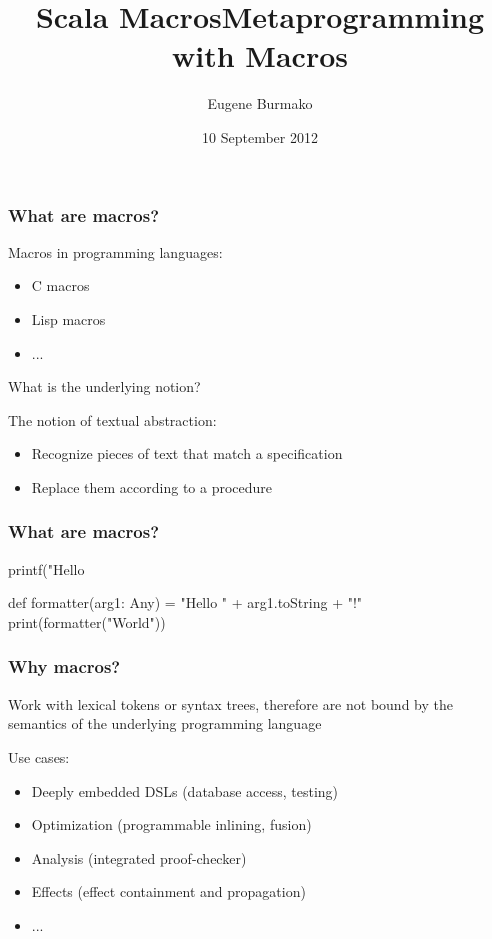 \documentclass[hyperref={bookmarks=false}]{beamer}
\title{Scala Macros}
\begin{document}
\title{Metaprogramming with Macros}
\author{Eugene Burmako}
\date{10 September 2012}
{
\begin{frame}
  \titlepage
\end{frame}
}

\begin{frame}[fragile]
\frametitle{What are macros?}
Macros in programming languages:
\begin{itemize}
\item C macros
\item Lisp macros
\item ...
\end{itemize}

\vskip25pt
What is the underlying notion?
\vskip25pt
\pause

The notion of textual abstraction:
\begin{itemize}
\item Recognize pieces of text that match a specification
\item Replace them according to a procedure
\end{itemize}
\end{frame}

\begin{frame}[fragile]
\frametitle{What are macros?}
\begin{semiverbatim}
printf("Hello %
\end{semiverbatim}

\hskip70pt

\begin{semiverbatim}
def formatter(arg1: Any) = "Hello " + arg1.toString + "!"
print(formatter("World"))
\end{semiverbatim}
\end{frame}

\begin{frame}[fragile]
\frametitle{Why macros?}

Work with lexical tokens or syntax trees, therefore are not bound by the semantics of the underlying
programming language

Use cases:
\begin{itemize}
\item Deeply embedded DSLs (database access, testing)
\item Optimization (programmable inlining, fusion)
\item Analysis (integrated proof-checker)
\item Effects (effect containment and propagation)
\item ...
\end{itemize}
\end{frame}
\end{document}

